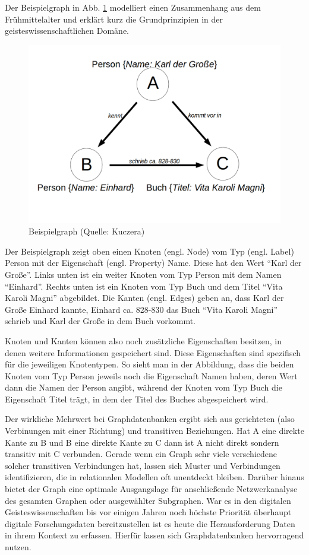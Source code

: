 \documentclass[ngerman,]{scrreprt}
\begin{document}
Der Beispielgraph in Abb. \ref{beispielgraph} modelliert einen Zusammenhang aus dem Frühmittelalter und erklärt kurz die Grundprinzipien in der geisteswissenschaftlichen Domäne.

\begin{figure}
\centering
\includegraphics{Bilder/Beispielgraph.png}
\caption{Beispielgraph (Quelle: Kuczera)}
\label{beispielgraph}
\end{figure}

Der Beispielgraph zeigt oben einen Knoten (engl. Node) vom Typ (engl. Label) Person mit der Eigenschaft (engl. Property) Name. Diese hat den Wert ``Karl der Große''. Links unten ist ein weiter Knoten vom Typ Person mit dem Namen ``Einhard''. Rechts unten ist ein Knoten vom Typ Buch und dem Titel ``Vita Karoli Magni'' abgebildet. Die Kanten (engl. Edges) geben an, dass Karl der Große Einhard kannte, Einhard ca. 828-830 das Buch ``Vita Karoli Magni'' schrieb und Karl der Große in dem Buch vorkommt.

Knoten und Kanten können also noch zusätzliche Eigenschaften besitzen, in denen weitere Informationen gespeichert sind. Diese Eigenschaften sind spezifisch für die jeweiligen Knotentypen. So sieht man in der Abbildung, dass die beiden Knoten vom Typ Person jeweils noch die Eigenschaft Namen haben, deren Wert dann die Namen der Person angibt, während der Knoten vom Typ Buch die Eigenschaft Titel trägt, in dem der Titel des Buches abgespeichert wird.

Der wirkliche Mehrwert bei Graphdatenbanken ergibt sich aus gerichteten (also Verbinungen mit einer Richtung) und transitiven Beziehungen. Hat A eine direkte Kante zu B und B eine direkte Kante zu C dann ist A nicht direkt sondern transitiv mit C verbunden. Gerade wenn ein Graph sehr viele verschiedene solcher transitiven Verbindungen hat, lassen sich Muster und Verbindungen identifizieren, die in relationalen Modellen oft unentdeckt bleiben. Darüber hinaus bietet der Graph eine optimale Ausgangslage für anschließende Netzwerkanalyse des gesamten Graphen oder ausgewählter Subgraphen. War es in den digitalen Geisteswissenschaften bis vor einigen Jahren noch höchste Priorität überhaupt digitale Forschungsdaten bereitzustellen ist es heute die Herausforderung Daten in ihrem Kontext zu erfassen. Hierfür lassen sich Graphdatenbanken hervorragend nutzen.
\end{document}
